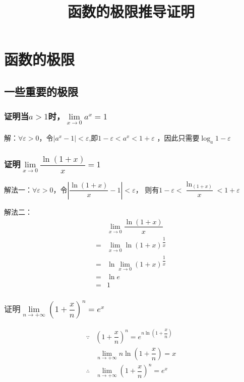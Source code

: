 \documentclass[a4paper, 12pt, draft]{article}
\title{函数的极限推导证明}
\author{}
\date{}
\begin{document}
\maketitle
\tableofcontents

\newpage
\section{函数的极限}
    \subsection{一些重要的极限}

    \subsubsection{ 证明当$a > 1$时，$\lim\limits_{x \to 0} a^x = 1$ }
    解：$\forall \varepsilon > 0$，令$|a^x-1| < \varepsilon$,即$1 - \varepsilon < a^x < 1 + \varepsilon$
    ，因此只需要$ \log_a{1 - \varepsilon}  $ 

    \subsubsection{ 证明$\lim\limits_{x \to 0} \dfrac{\ln(1+x)}{x} = 1 $ }
    解法一：$\forall \varepsilon > 0$，令$\left|\dfrac{\ln(1+x)}{x} - 1 \right| < \varepsilon$，
    则有$ 1-\varepsilon < \dfrac{\ln_{\left( 1+x \right)} }{x} < 1 + \varepsilon $
    
    解法二：
    \[
        \begin{aligned}
              & \lim\limits_{ x \to 0 } \dfrac{ \ln{\left( 1+x \right)} }{x} \\
            = & \lim\limits_{ x \to 0 } \ln{\left(1 + x\right)^{\dfrac{1}{x}}} \\
            = & \ln{ \lim\limits_{ x \to 0 }  \left(1 + x\right)^{\dfrac{1}{x}}} \\
            = & \ln{e} \\ 
            = & 1
        \end{aligned}
    \]

    \subsubsection{$ \text{证明} \lim\limits_{n \to + \infty } \left(1 + \dfrac{x}{n} \right)^{n} = e^x $}    
    \[
        \begin{aligned}
            \because & \left( 1+\dfrac{x}{n} \right)^{n} = e^{n \ln{\left(1 + \dfrac{x}{n} \right)} } \\
            & \lim\limits_{n \to +\infty} n \ln{\left(1 + \dfrac{x}{n} \right)} = x \\
            \therefore & \lim\limits_{n \to + \infty } \left(1 + \dfrac{x}{n} \right)^{n} = e^x
        \end{aligned}
    \]
\end{document}
